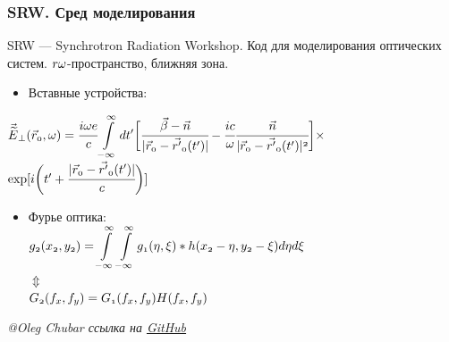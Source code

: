 \documentclass[14pt, hyperref = {colorlinks}]{beamer}
\begin{document}
\small
\begin{frame}
\frametitle{SRW. Сред моделирования}\label{t1}
SRW --- Synchrotron Radiation Workshop. Код для моделирования оптических систем.
$\mathnormal{r\omega}$-пространство, ближняя зона.\\
\begin{itemize}
	\item Вставные устройства:\\
\end{itemize}
	\hspace{25pt}$\mathnormal{\vec{\widetilde{E}}_{\bot}(\vec{r}_0, \omega) = 
	\cfrac{i\omega e}{c}\displaystyle\int\limits_{-\infty}^{\infty} dt'\bigg[\cfrac{\vec{\beta} - \vec{n}}{|\vec{r}_0 - \vec{r'}_0(t')|} - \cfrac{ic}{\omega}\cfrac{\vec{n}}{|\vec{r}_0 - \vec{r'}_0(t')|^2}\bigg]\times}$\\
	\hspace{195pt}$\mathnormal{\exp[i\bigg(t' + \cfrac{|\vec{r}_0 - \vec{r'}_0(t')|}{c}\bigg)]}$

\begin{itemize}	
	\item Фурье оптика:\\
	\centering
	\vspace{-10pt}
	$\mathnormal{g_2(x_2, y_2) = \displaystyle\int\limits_{-\infty}^{\infty}\displaystyle\int\limits_{-\infty}^{\infty}
		g_1(\eta, \xi) \ast h(x_2 - \eta, y_2 - \xi)}d\eta d\xi$ \\
	\vspace{-6pt}
	$\Updownarrow$\\
	\vspace{6pt}
	$\mathnormal{G_2(f_x, f_y) = G_1(f_x, f_y)H(f_x, f_y)}$
\end{itemize}
\tiny{\textit{@Oleg Chubar ссылка на \href{https://github.com/ochubar/SRW.git}{GitHub}}}
\end{frame}
\end{document}
